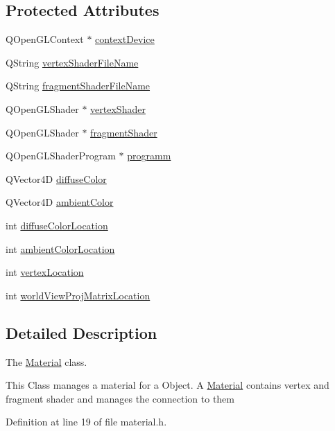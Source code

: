 \subsection*{Protected Attributes}
\begin{DoxyCompactItemize}
\item 
Q\+Open\+G\+L\+Context $\ast$ \hyperlink{class_material_a83da87bdd6d755b6f8ed40929001d355}{context\+Device}
\item 
Q\+String \hyperlink{class_material_af8361fc71a1f55c5a49100bee94bd94a}{vertex\+Shader\+File\+Name}
\item 
Q\+String \hyperlink{class_material_a8adf8679e41e341b339f3460c3ba45ee}{fragment\+Shader\+File\+Name}
\item 
Q\+Open\+G\+L\+Shader $\ast$ \hyperlink{class_material_af7fc01b5cbebefdc983797f60cd4772c}{vertex\+Shader}
\item 
Q\+Open\+G\+L\+Shader $\ast$ \hyperlink{class_material_a9a2cb05e65584fa9d4f0f4f0af74d55e}{fragment\+Shader}
\item 
Q\+Open\+G\+L\+Shader\+Program $\ast$ \hyperlink{class_material_aa5f04d76a6b53bfb6eba238db8328490}{programm}
\item 
Q\+Vector4\+D \hyperlink{class_material_a38b1cde46c908ae719ebaf9de1efb5ff}{diffuse\+Color}
\item 
Q\+Vector4\+D \hyperlink{class_material_aabbefbcb0d05f0ae4521eb68183ff702}{ambient\+Color}
\item 
int \hyperlink{class_material_ad4963cc03e54c2e539a98b60070d2beb}{diffuse\+Color\+Location}
\item 
int \hyperlink{class_material_a938adfa6b527c7462df99493968f14aa}{ambient\+Color\+Location}
\item 
int \hyperlink{class_material_ac1241a29b62d04848cdc190f1de85849}{vertex\+Location}
\item 
int \hyperlink{class_material_a12a1db7e857ec3bcbacbcd646f5cd16f}{world\+View\+Proj\+Matrix\+Location}
\end{DoxyCompactItemize}


\subsection{Detailed Description}
The \hyperlink{class_material}{Material} class. 

This Class manages a material for a Object. A \hyperlink{class_material}{Material} contains vertex and fragment shader and manages the connection to them 

Definition at line 19 of file material.\+h.



